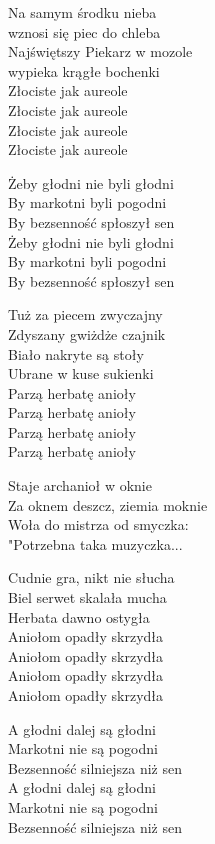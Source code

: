 \begin{text}
    Na samym środku nieba\\
    wznosi się piec do chleba\\
    Najświętszy Piekarz w mozole\\
    wypieka krągłe bochenki\\
    Złociste jak aureole\\
    Złociste jak aureole\\
    Złociste jak aureole\\
    Złociste jak aureole

    \vin Żeby głodni nie byli głodni\\
    \vin By markotni byli pogodni\\
    \vin By bezsenność spłoszył sen\\
    \vin Żeby głodni nie byli głodni\\
    \vin By markotni byli pogodni\\
    \vin By bezsenność spłoszył sen

    \hfill\break
    Tuż za piecem zwyczajny\\
    Zdyszany gwiżdże czajnik\\
    Biało nakryte są stoły\\
    Ubrane w kuse sukienki\\
    Parzą herbatę anioły\\
    Parzą herbatę anioły\\
    Parzą herbatę anioły\\
    Parzą herbatę anioły

    Staje archanioł w oknie\\
    Za oknem deszcz, ziemia moknie\\
    Woła do mistrza od smyczka:\\
    "Potrzebna taka muzyczka...

    Cudnie gra, nikt nie słucha\\
    Biel serwet skalała mucha\\
    Herbata dawno ostygła\\
    Aniołom opadły skrzydła\\
    Aniołom opadły skrzydła\\
    Aniołom opadły skrzydła\\
    Aniołom opadły skrzydła

    A głodni dalej są głodni\\
    Markotni nie są pogodni\\
    Bezsenność silniejsza niż sen\\
    A głodni dalej są głodni\\
    Markotni nie są pogodni\\
    Bezsenność silniejsza niż sen
\end{text}
